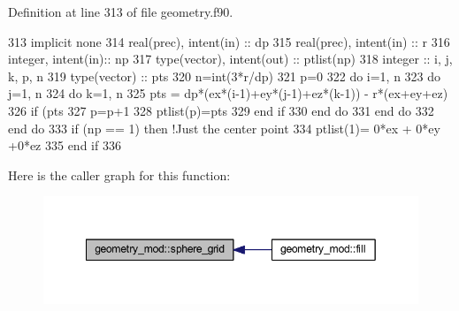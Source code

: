 Definition at line 313 of file geometry.\+f90.


\begin{DoxyCode}
313     \textcolor{keywordtype}{implicit none}
314     \textcolor{keywordtype}{real(prec)}, \textcolor{keywordtype}{intent(in)} :: dp
315     \textcolor{keywordtype}{real(prec)}, \textcolor{keywordtype}{intent(in)} :: r
316     \textcolor{keywordtype}{integer}, \textcolor{keywordtype}{intent(in)}::  np
317     \textcolor{keywordtype}{type}(vector), \textcolor{keywordtype}{intent(out)} :: ptlist(np)
318     \textcolor{keywordtype}{integer} :: i, j, k, p, n
319     \textcolor{keywordtype}{type}(vector) :: pts
320     n=int(3*r/dp)
321     p=0
322     \textcolor{keywordflow}{do} i=1, n
323         \textcolor{keywordflow}{do} j=1, n
324             \textcolor{keywordflow}{do} k=1, n
325                 pts = dp*(ex*(i-1)+ey*(j-1)+ez*(k-1)) - r*(ex+ey+ez)
326                 \textcolor{keywordflow}{if} (pts%
327                     p=p+1
328                     ptlist(p)=pts
329 \textcolor{keywordflow}{                end if}
330 \textcolor{keywordflow}{            end do}
331 \textcolor{keywordflow}{        end do}
332 \textcolor{keywordflow}{    end do}
333     \textcolor{keywordflow}{if} (np == 1) \textcolor{keywordflow}{then} \textcolor{comment}{!Just the center point}
334         ptlist(1)= 0*ex + 0*ey +0*ez
335 \textcolor{keywordflow}{    end if}
336 
\end{DoxyCode}
Here is the caller graph for this function\+:\nopagebreak
\begin{figure}[H]
\begin{center}
\leavevmode
\includegraphics[width=349pt]{namespacegeometry__mod_a6c03a4ea3de6763940396dbeb3908ebc_icgraph}
\end{center}
\end{figure}
\mbox{\label{namespacegeometry__mod_a05de7940b4e7df5a2b31f3d0414e3743}} 
